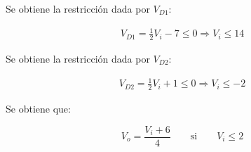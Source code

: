 Se obtiene la restricción dada por $V_{D1}$:

\begin{align*}
  V_{D1} = \frac{1}{2} V_i - 7 \leq 0
  \Rightarrow
  V_i \leq 14
\end{align*}

Se obtiene la restricción dada por $V_{D2}$:

\begin{align*}
  V_{D2} = \frac{1}{2} V_i + 1 \leq 0
  \Rightarrow
  V_i \leq -2
\end{align*}

Se obtiene que:

\begin{equation} \label{p3:offoff}
  V_o = \frac{V_i + 6}{4}
  \quad
  \quad
  \mathrm{si}
  \quad
  \quad
  V_i \leq 2
\end{equation}
